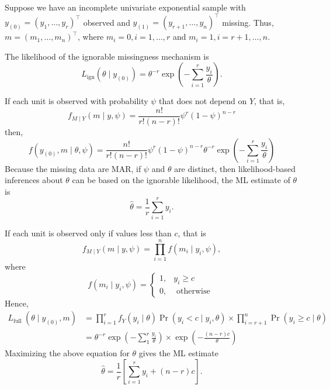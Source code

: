 \begin{example}
	Suppose we have an incomplete univariate exponential sample with $y_{(0)}=\left(y_{1},\ldots,y_{r}\right)^{\top}$ observed and $y_{(1)}=\left(y_{r+1},\ldots,y_{n}\right)^{\top}$ missing. Thus, $m=\left(m_{1},\ldots,m_{n}\right)^{\top}$, where $m_{i}=0,i=1,\ldots,r$ and $m_{i}=1,i=r+1,\ldots,n$.

	The likelihood of the ignorable missingness mechanism is
	\begin{equation}
		L_{\mathrm{ign}}\left(\theta\mid y_{(0)}\right)=\theta^{-r}\exp\left(-\sum_{i=1}^{r}\frac{y_{i}}{\theta}\right).
	\end{equation}

	If each unit is observed with probability $\psi$ that does not depend on $Y$, that is,
	\begin{equation}
		f_{M\mid Y}(m\mid y,\psi)=\frac{n!}{r!(n-r)!}\psi^{r}(1-\psi)^{n-r}
	\end{equation}
	then,
	\begin{equation}
		f\left(y_{(0)},m\mid\theta,\psi\right)=\frac{n!}{r!(n-r)!}\psi^{r}(1-\psi)^{n-r}\theta^{-r}\exp\left(-\sum_{i=1}^{r}\frac{y_{i}}{\theta}\right)
	\end{equation}
	Because the missing data are MAR, if $\psi$ and $\theta$ are distinct, then likelihood-based
	inferences about $\theta$ can be based on the ignorable likelihood, the ML estimate of $\theta$ is
	\begin{equation}
		\hat{\theta}=\frac{1}{r}\sum_{i=1}^{r}y_{i}.
	\end{equation}

	If each unit is observed only if values less than $c$, that is
	\begin{equation}
		f_{M\mid Y}(m\mid y,\psi)=\prod_{i=1}^{n}f\left(m_{i}\mid y_{i},\psi\right),
	\end{equation}
	where
	\begin{equation}
		f\left(m_{i} \mid y_{i}, \psi\right)=\left\{\begin{array}{ll}
			1, & y_{i}\geq c        \\
			0, & \text{ otherwise }
		\end{array}\right.
	\end{equation}
	Hence,
	\begin{equation}
		\begin{aligned}
			L_{\text {full }}\left(\theta \mid y_{(0)}, m\right) & =\prod_{i=1}^{r} f_{Y}\left(y_{i} \mid \theta\right) \operatorname{Pr}\left(y_{i}<c \mid y_{i}, \theta\right) \times \prod_{i=r+1}^{n} \operatorname{Pr}\left(y_{i} \geq c \mid \theta\right) \\
			                                                     & =\theta^{-r} \exp \left(-\sum_{1}^{r} \frac{y_{i}}{\theta}\right) \times \exp \left(-\frac{(n-r) c}{\theta}\right)
		\end{aligned}
	\end{equation}
	Maximizing the above equation for $\theta$ gives the ML estimate
	\begin{equation}
		\hat{\theta}=\frac{1}{r}\left[\sum_{i=1}^{r}y_{i}+(n-r)c\right].
	\end{equation}


\end{example}
